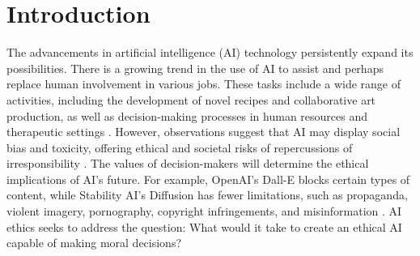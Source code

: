 \documentclass[sigconf]{acmart}
\begin{document}



\maketitle

%
%
\section{Introduction}

The advancements in artificial intelligence (AI) technology persistently expand its possibilities. There is a growing trend in the use of AI to assist and perhaps replace human involvement in various jobs. These tasks include a wide range of activities, including the development of novel recipes and collaborative art production, as well as decision-making processes in human resources and therapeutic settings \cite{tolmeijer2022capable}. However, observations suggest that AI may display social bias and toxicity, offering ethical and societal risks of repercussions of irresponsibility \cite{Zhuo2023Exploring}. The values of decision-makers will determine the ethical implications of AI's future. For example, OpenAI's Dall-E blocks certain types of content, while Stability AI's Diffusion has fewer limitations, such as propaganda, violent imagery, pornography, copyright infringements, and misinformation \cite{Brusseau2022Acceleration}. AI ethics seeks to address the question: What would it take to create an ethical AI capable of making moral decisions? 
\end{document}
